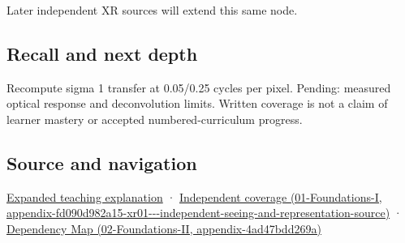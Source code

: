 Later independent XR sources will extend this same node.

\subsection{Recall and next depth}\label{appendix-8b76b0efd27f-recall-and-next-depth}

Recompute sigma 1 transfer at 0.05/0.25 cycles per pixel. Pending: measured optical response and deconvolution limits. Written coverage is not a claim of learner mastery or accepted numbered-curriculum progress.

\subsection{Source and navigation}\label{appendix-8b76b0efd27f-source-and-navigation}

\hyperref[04-visual-computing-ii-ch042-a-footprint-is-more-meaningful-than-an-isolated-pixel-center]{Expanded teaching explanation} · \href{../01-Foundations-I/main.pdf\#nameddest=appendix-fd090d982a15-xr01---independent-seeing-and-representation-source}{Independent coverage (01-Foundations-I, appendix-fd090d982a15-xr01-\/-\/-independent-seeing-and-representation-source)} · \href{../02-Foundations-II/main.pdf\#nameddest=appendix-4ad47bdd269a}{Dependency Map (02-Foundations-II, appendix-4ad47bdd269a)}
